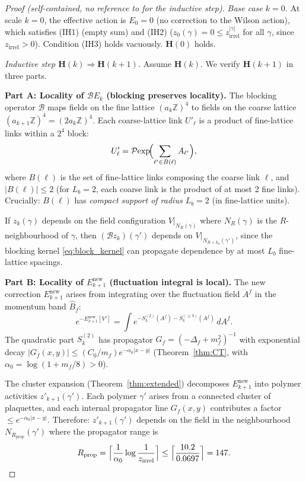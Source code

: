 \documentclass[11pt,a4paper]{amsart}
\theoremstyle{definition}
\newcommand{\Z}{\mathbb{Z}}
\begin{document}
\begin{proof}[Proof (self-contained, no reference to \cite{B87,B88} for the inductive step)]

\emph{Base case $k = 0$.}
At scale $k=0$, the effective action is $E_0 = 0$ (no correction to the Wilson action),
which satisfies (IH1) (empty sum) and (IH2) ($z_0(\gamma) = 0 \le z_{\mathrm{irrel}}^{|\gamma|}$
for all $\gamma$, since $z_{\mathrm{irrel}} > 0$).
Condition (IH3) holds vacuously.  $\mathbf{H}(0)$ holds.

\emph{Inductive step $\mathbf{H}(k) \Rightarrow \mathbf{H}(k+1)$.}
Assume $\mathbf{H}(k)$.  We verify $\mathbf{H}(k+1)$ in three parts.

\textbf{Part A: Locality of $\mathcal{B}E_k$ (blocking preserves locality).}
The blocking operator $\mathcal{B}$ maps fields on the fine lattice $(a_k\Z)^4$
to fields on the coarse lattice $(a_{k+1}\Z)^4 = (2a_k\Z)^4$.  Each coarse-lattice
link $U'_\ell$ is a product of fine-lattice links within a $2^4$ block:
\begin{equation}\label{eq:block_kernel}
  U'_\ell = \mathcal{P}\!\exp\!\Bigl(\sum_{\ell'\in B(\ell)} A_{\ell'}\Bigr),
\end{equation}
where $B(\ell)$ is the set of fine-lattice links composing the coarse link $\ell$,
and $|B(\ell)| \le 2$ (for $L_b = 2$, each coarse link is the product of at most 2
fine links).  Crucially: $B(\ell)$ has \emph{compact support of radius $L_b = 2$}
(in fine-lattice units).

If $z_k(\gamma)$ depends on the field configuration $V\big|_{N_R(\gamma)}$ where
$N_R(\gamma)$ is the $R$-neighbourhood of $\gamma$, then $(\mathcal{B}z_k)(\gamma')$
depends on $V\big|_{N_{R+L_b}(\gamma')}$, since the blocking kernel \eqref{eq:block_kernel}
can propagate dependence by at most $L_b$ fine-lattice spacings.

\textbf{Part B: Locality of $E^{\mathrm{new}}_{k+1}$ (fluctuation integral is local).}
The new correction $E^{\mathrm{new}}_{k+1}$ arises from integrating over the
fluctuation field $A^f$ in the momentum band $\hat{B}_f$:
\[
  e^{-E^{\mathrm{new}}_{k+1}[V']}
  = \int e^{-S_k^{(2)}(A^f) - S_k^{(\ge 3)}(A^f)} \,dA^f.
\]
The quadratic part $S_k^{(2)}$ has propagator $G_f = (-\Delta_f + m_f^2)^{-1}$
with exponential decay $|G_f(x,y)| \le (C_0/m_f) e^{-\alpha_0|x-y|}$
(Theorem~\ref{thm:CT}, with $\alpha_0 = \log(1 + m_f/8) > 0$).

The cluster expansion (Theorem~\ref{thm:extended}) decomposes
$E^{\mathrm{new}}_{k+1}$ into polymer activities $z'_{k+1}(\gamma')$.  Each
polymer $\gamma'$ arises from a connected cluster of plaquettes, and each
internal propagator line $G_f(x,y)$ contributes a factor $\le e^{-\alpha_0|x-y|}$.
Therefore: $z'_{k+1}(\gamma')$ depends on the field in the neighbourhood
$N_{R_{\mathrm{prop}}}(\gamma')$ where the propagator range is
\[
  R_{\mathrm{prop}} = \Bigl\lceil \frac{1}{\alpha_0}\log\frac{1}{z_{\mathrm{irrel}}}\Bigr\rceil
  \le \Bigl\lceil \frac{10.2}{0.0697}\Bigr\rceil = 147.
\]


\end{proof}
\end{document}

